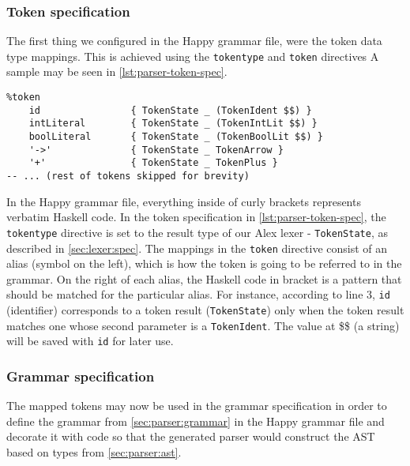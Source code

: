 \subsubsection{Token specification}
The first thing we configured in the Happy grammar file, were the token data type mappings. This is achieved using the \lstinline[mathescape]{tokentype} and \lstinline{token} directives A sample may be seen in \cref{lst:parser-token-spec}.
\begin{lstlisting}[language=happy, float=htb,
caption={Example of our token mappings in the Happy grammar file},
label=lst:parser-token-spec]
%tokentype            { TokenState }
%token
    id                { TokenState _ (TokenIdent $$) }
    intLiteral        { TokenState _ (TokenIntLit $$) }
    boolLiteral       { TokenState _ (TokenBoolLit $$) }
    '->'              { TokenState _ TokenArrow }
    '+'               { TokenState _ TokenPlus }
-- ... (rest of tokens skipped for brevity)
\end{lstlisting}
\par In the Happy grammar file, everything inside of curly brackets represents verbatim Haskell code. In the token specification in \cref{lst:parser-token-spec}, the \lstinline{tokentype} directive is set to the result type of our Alex lexer - \lstinline{TokenState}, as described in \cref{sec:lexer:spec}. The mappings in the \lstinline{token} directive consist of an alias (symbol on the left), which is how the token is going to be referred to in the grammar. On the right of each alias, the Haskell code in bracket is a pattern that should be matched for the particular alias. For instance, according to line 3, \lstinline{id} (identifier) corresponds to a token result (\lstinline{TokenState}) only when the token result matches one whose second parameter is a \lstinline{TokenIdent}. The value at \$\$ (a string) will be saved with \lstinline{id} for later use.
\subsubsection{Grammar specification}
The mapped tokens may now be used in the grammar specification in order to define the grammar from \ref{sec:parser:grammar} in the Happy grammar file and decorate it with code so that the generated parser would construct the AST based on types from \cref{sec:parser:ast}.

